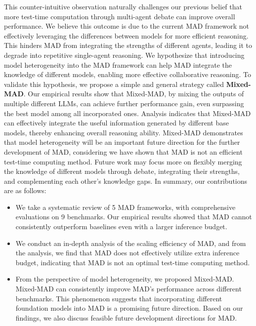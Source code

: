 This counter-intuitive observation naturally challenges our previous belief that more test-time computation through multi-agent debate can improve overall performance. We believe this outcome is due to the current MAD framework not effectively leveraging the differences between models for more efficient reasoning. This hinders MAD from integrating the strengths of different agents, leading it to degrade into repetitive single-agent reasoning. We hypothesize that introducing model heterogeneity into the MAD framework can help MAD integrate the knowledge of different models, enabling more effective collaborative reasoning. To validate this hypothesis, we propose a simple and general strategy called \textbf{Mixed-MAD}. Our empirical results show that Mixed-MAD, by mixing the outputs of multiple different LLMs, can achieve further performance gain, even surpassing the best model among all incorporated ones. Analysis indicates that Mixed-MAD can effectively integrate the useful information generated by different base models, thereby enhancing overall reasoning ability. Mixed-MAD demonstrates that model heterogeneity will be an important future direction for the further development of MAD, considering we have shown that MAD is not an efficient test-time computing method. Future work may focus more on flexibly merging the knowledge of different models through debate, integrating their strengths, and complementing each other's knowledge gaps. In summary, our contributions are as follows:

\begin{itemize}
    \item We take a systematic review of 5 MAD frameworks, with comprehensive evaluations on 9 benchmarks. Our empirical results showed that MAD cannot consistently outperform baselines even with a larger inference budget.

    \item We conduct an in-depth analysis of the scaling efficiency of MAD, and from the analysis, we find that MAD does not effectively utilize extra inference budget, indicating that MAD is not an optimal test-time computing method.

    \item From the perspective of model heterogeneity, we proposed Mixed-MAD. Mixed-MAD can consistently improve MAD's performance across different benchmarks. This phenomenon suggests that incorporating different foundation models into MAD is a promising future direction. Based on our findings, we also discuss feasible future development directions for MAD.
\end{itemize}





